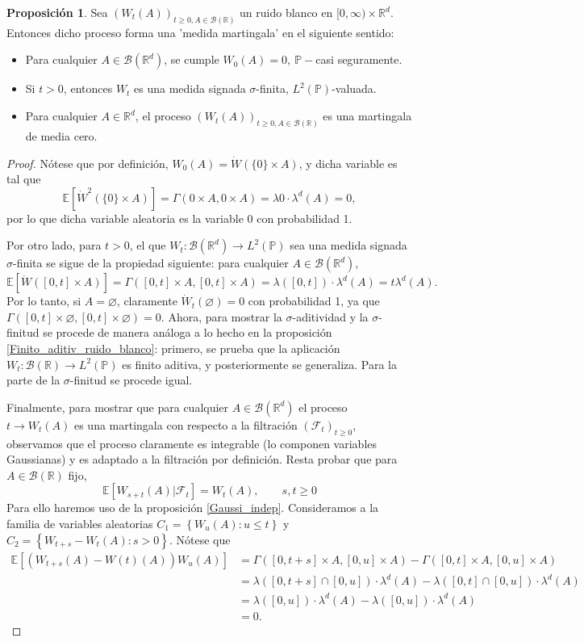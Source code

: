 \documentclass[letterpaper,twoside]{book}
\newcommand{\R}{\mathbb{R}}
\newcommand{\F}{\mathcal{F}}
\newcommand{\B}{\mathcal{B}}
\newcommand{\E}{\mathbb{E}}
\renewcommand{\P}{\mathbb{P}}
\newcommand{\W}{\dot{W}}
\newcommand{\1}{\mathds{1}}
\renewcommand{\to}{\rightarrow}
\theoremstyle{definition}
\theoremstyle{definition}
\theoremstyle{definition}
\theoremstyle{definition}
\newtheorem{prop}{Proposición}
\theoremstyle{definition}
\theoremstyle{definition}
\theoremstyle{definition}
\begin{document}
\begin{prop} 
Sea $(W_t(A))_{t\geq0, A\in \B(\R)}$ un ruido blanco en $[0,\infty)\times \R^{d}$. Entonces dicho proceso forma una 'medida martingala' en el siguiente sentido:
\begin{itemize}
    \item Para cualquier $A\in \B(\R^{d})$, se cumple $W_0(A)=0, \ \P-$casi seguramente.
    \item Si $t>0$, entonces $W_t$ es una medida signada $\sigma$-finita, $L^{2}(\P)$-valuada.
    \item Para cualquier $A\in \R^{d}$, el proceso $(W_t(A))_{t\geq0, A\in \B(\R)}$ es una martingala de media cero.
\end{itemize}
 \end{prop}
\begin{proof} 
  Nótese que por definición, $W_0(A)=\W(\{0\}\times A)$, y dicha variable es tal que 
  \[
  \E\left[\W^2(\{0\}\times A)\right]=\Gamma(0\times A,0\times A)=\lambda{0}\cdot\lambda^{d}(A)=0,  
  \]
  por lo que dicha variable aleatoria es la variable 0 con probabilidad 1.

  Por otro lado, para $t>0$, el que $W_t:\B(\R^{d})\to L^{2}(\P)$ sea una medida signada $\sigma$-finita se sigue de la propiedad siguiente: para cualquier $A\in \B(\R^{d})$, 
  \[
  \E\left[\W([0,t]\times A)\right]=\Gamma([0,t]\times A, [0,t]\times A)=\lambda([0,t])\cdot\lambda^{d}(A)=t\lambda^{d}(A). 
  \] 
  Por lo tanto, si $A=\varnothing$, claramente $\W_t(\varnothing)=0$ con probabilidad 1, ya que $\Gamma([0,t]\times\varnothing,[0,t]\times \varnothing)=0$. Ahora, para mostrar la $\sigma$-aditividad y la $\sigma$-finitud se procede de manera análoga a lo hecho en la proposición \ref{Finito_aditiv_ruido_blanco}: primero, se prueba que la aplicación $W_t:\B(\R)\to L^{2}(\P)$ es finito aditiva, y posteriormente se generaliza. Para la parte de la $\sigma$-finitud se procede igual.

  Finalmente, para mostrar que para cualquier $A\in \B(\R^{d})$ el proceso $t\to W_t(A)$ es una martingala con respecto a la filtración $(\F_t)_{t\geq0}$, observamos que el proceso claramente es integrable (lo componen variables Gaussianas) y es adaptado a la filtración por definición. Resta probar que para $A\in \B(\R)$ fijo,
  \[
  \E\left[W_{s+t}(A)\lvert \F_t\right]=W_t(A), \qquad s,t\geq0  
  \]
  Para ello haremos uso de la proposición \ref{Gaussi_indep}. Consideramos a la familia de variables aleatorias $C_1=\left\{W_u(A):u\leq t\right\}$ y
  $C_2=\left\{W_{t+s}-W_t(A):s>0 \right\}$. Nótese que 
  \begin{align*}
    \E\left[(W_{t+s}(A)-W(t)(A))W_u(A)\right]&=\Gamma([0,t+s]\times A, [0,u]\times A)-\Gamma([0,t]\times A,[0,u]\times A)\\
    &=\lambda([0,t+s]\cap[0,u])\cdot\lambda^{d}(A)-\lambda([0,t]\cap[0,u])\cdot\lambda^{d}(A)\\
    &=\lambda([0,u])\cdot\lambda^{d}(A)-\lambda([0,u])\cdot\lambda^{d}(A)\\
    &=0.
  \end{align*}
   \end{proof}
\end{document}
